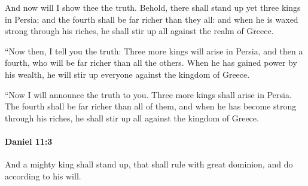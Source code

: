 			\begin{versebox}
					\item[BHS] 
					\item[LXX] 
					\item[ASV] And now will I show thee the truth. Behold, there shall stand up yet three kings in Persia; and the fourth shall be far richer than they all: and when he is waxed strong through his riches, he shall stir up all against the realm of Greece.
					\item[NIV] “Now then, I tell you the truth: Three more kings will arise in Persia, and then a fourth, who will be far richer than all the others. When he has gained power by his wealth, he will stir up everyone against the kingdom of Greece.
					\item[NRSV] “Now I will announce the truth to you. Three more kings shall arise in Persia. The fourth shall be far richer than all of them, and when he has become strong through his riches, he shall stir up all against the kingdom of Greece.
			\end{versebox}

		\paragraph{Daniel 11:3} %
			\label{DANIEL-11-3}

			And a mighty king shall stand up, that shall rule with great dominion, and do according to his will.

